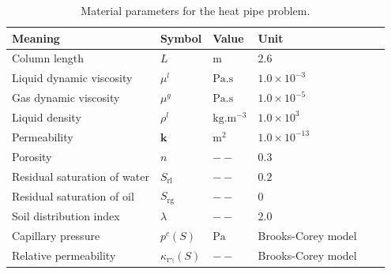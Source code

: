 \begin{table}[!htb]
\caption{Material parameters for the heat pipe problem.}
\label{tab:HP1}
\begin{tabular}{l*{4}{l}r}
\hline
\textbf{Meaning} & \textbf{Symbol} &  \textbf{Value} &  \textbf{Unit} \\
\hline
Column length & $L$ & $\mathrm m$ & $2.6$  \\
Liquid dynamic viscosity &  $\mu^l$ & $\mathrm {Pa.s}$ & $1.0\times10^{-3}$ \\
Gas dynamic viscosity & $\mu^g$ & $\mathrm {Pa.s}$ & $1.0\times10^{-5}$ \\
Liquid density &  $\rho^l$ &$\mathrm {kg.m^{-3}}$ & $1.0\times10^{3}$ \\
Permeability & $\mathbf k$ & $ \mathrm {m^2}$ & $1.0\times 10^{-13}$ \\
Porosity & $n$ & $--$ & $0.3$ \\
Residual saturation of water &  $S_{\mathrm{rl}}$ & $--$ & $0.2$ \\
Residual saturation of oil &  $S_{\mathrm{rg}}$ & $--$ & $0$ \\
Soil distribution index &  $\lambda$ & $--$ & $2.0$ \\
Capillary pressure & $p^c(S)$ & $\mathrm {Pa}$ & Brooks-Corey model\\
Relative permeability & $\kappa_{\mathrm {r\gamma}}(S)$ & $--$ & Brooks-Corey model \\ \hline
\end{tabular}
\end{table}
